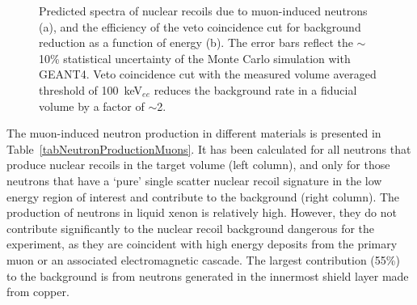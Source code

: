 \begin{figure}[!b]
\centering
{}
\caption[Predicted spectra of nuclear recoils due to muon-induced neutrons, and the efficiency of the veto coincidence cut for background reduction as a function of energy]{Predicted spectra of nuclear recoils due to muon-induced neutrons (a), and the efficiency of the veto coincidence cut for background reduction as a function of energy (b). The error bars reflect the $\sim$10\% statistical uncertainty of the Monte Carlo simulation with GEANT4. Veto coincidence cut with the measured volume averaged threshold of 100~keV$_{ee}$ reduces the background rate in a fiducial volume by a factor of $\sim$2. }
\label{figMuonInducedBGspectra}
\end{figure}

The muon-induced neutron production in different materials is presented in Table~\ref{tabNeutronProductionMuons}. It has been calculated for all neutrons that produce nuclear recoils  in the target volume (left column), and only for those neutrons that have a `pure' single scatter nuclear recoil signature in the low energy region of interest and contribute to the background (right column). 
The production of neutrons in liquid xenon is relatively high. However, they do not contribute significantly to the nuclear recoil background dangerous for the experiment, as they are coincident with high energy deposits from the primary muon or an associated electromagnetic cascade. The largest contribution (55\%) to the background is from neutrons generated in the innermost shield layer made from copper.

